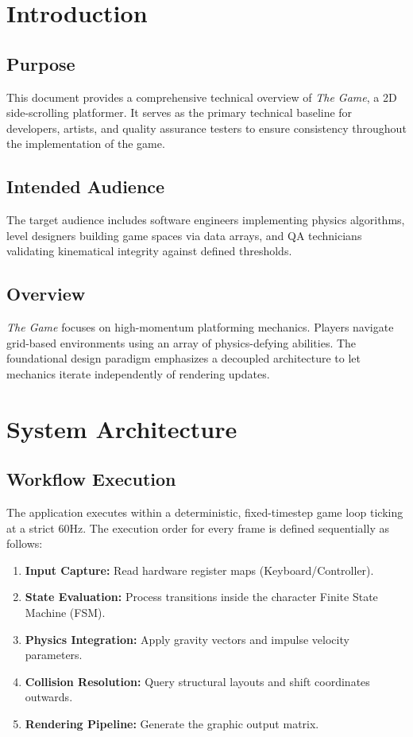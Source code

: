 \documentclass[runningheads]{llncs}
\begin{document}
\newpage


\section{Introduction}

\subsection{Purpose}
This document provides a comprehensive technical overview of \textit{The Game}, a 2D side-scrolling platformer. It serves as the primary technical baseline for developers, artists, and quality assurance testers to ensure consistency throughout the implementation of the game.

\subsection{Intended Audience}
The target audience includes software engineers implementing physics algorithms, level designers building game spaces via data arrays, and QA technicians validating kinematical integrity against defined thresholds.

\subsection{Overview}
\textit{The Game} focuses on high-momentum platforming mechanics. Players navigate grid-based environments using an array of physics-defying abilities. The foundational design paradigm emphasizes a decoupled architecture to let mechanics iterate independently of rendering updates.


\section{System Architecture}

\subsection{Workflow Execution}
The application executes within a deterministic, fixed-timestep game loop ticking at a strict 60Hz. The execution order for every frame is defined sequentially as follows:
\begin{enumerate}
    \item \textbf{Input Capture:} Read hardware register maps (Keyboard/Controller).
    \item \textbf{State Evaluation:} Process transitions inside the character Finite State Machine (FSM).
    \item \textbf{Physics Integration:} Apply gravity vectors and impulse velocity parameters.
    \item \textbf{Collision Resolution:} Query structural layouts and shift coordinates outwards.
    \item \textbf{Rendering Pipeline:} Generate the graphic output matrix.
\end{enumerate}
\end{document}
